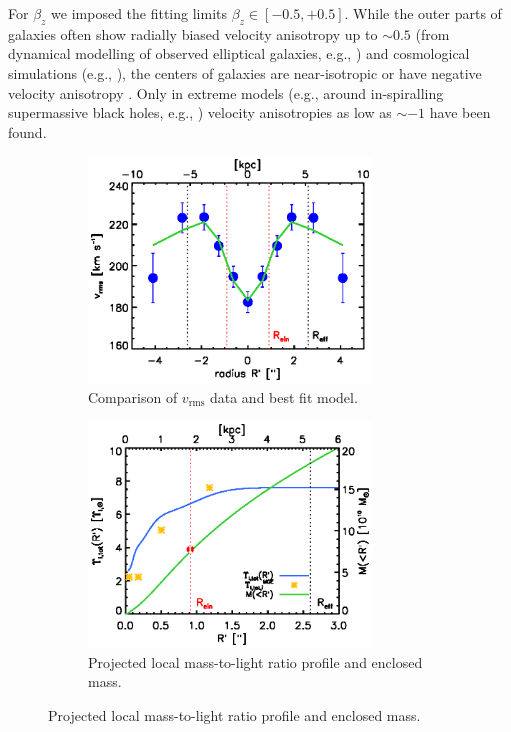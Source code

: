 For $\beta_z$ we imposed the fitting limits $\beta_z \in [-0.5,+0.5]$. While the outer parts of galaxies often show radially biased velocity anisotropy up to $\sim 0.5$ (from dynamical modelling of observed elliptical galaxies, e.g., \citet{Kronawitter2000}) and cosmological simulations (e.g., \citealt{2004MNRAS.352..535D,2001ApJ...557..533F}), the centers of galaxies are near-isotropic or have negative velocity anisotropy \citep{2003ApJ...583...92G}. Only in extreme models (e.g., around in-spiralling supermassive black holes, e.g., \citealt{1997NewA....2..533Q}) velocity anisotropies as low as $\sim -1$ have been found.


\begin{figure}
\centering
\begin{subfigure}{.5\textwidth}
  \centering
  \includegraphics[height=6cm]{fig/jam_G_vrms.ps}
  \caption{Comparison of $v_\text{rms}$ data and best fit model.}
  \label{fig:JAM_modelG}
\end{subfigure}%
\begin{subfigure}{.5\textwidth}
  \centering
  \includegraphics[height=6cm]{fig/jam_G_enclMass.ps}
  \caption{Projected local mass-to-light ratio profile and enclosed mass.}
  \label{fig:enclMass_modelG}
\end{subfigure}

\end{figure}
